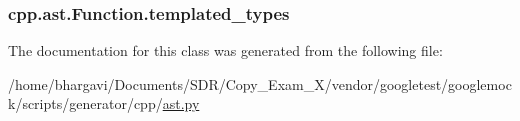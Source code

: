 \subsubsection[{\texorpdfstring{templated\+\_\+types}{templated_types}}]{\setlength{\rightskip}{0pt plus 5cm}cpp.\+ast.\+Function.\+templated\+\_\+types}\hypertarget{classcpp_1_1ast_1_1_function_a57bb03218bade3240137a0d91c467cb6}{}\label{classcpp_1_1ast_1_1_function_a57bb03218bade3240137a0d91c467cb6}


The documentation for this class was generated from the following file\+:\begin{DoxyCompactItemize}
\item 
/home/bhargavi/\+Documents/\+S\+D\+R/\+Copy\+\_\+\+Exam\+\_\+X/vendor/googletest/googlemock/scripts/generator/cpp/\hyperlink{ast_8py}{ast.\+py}\end{DoxyCompactItemize}

